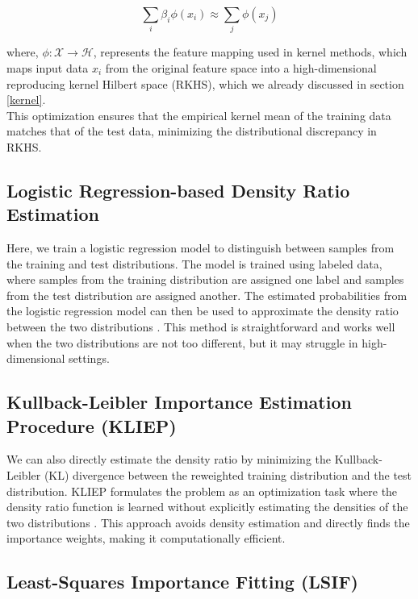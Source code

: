 \begin{equation}
    \sum_i \beta_i \phi(x_i) \approx \sum_j \phi(x_j)
    \label{eqn:3.17}
\end{equation}

where, $\phi: \mathcal{X} \to \mathcal{H}$, represents the feature mapping used in kernel methods, which maps input data $x_i$ from the original feature space into a high-dimensional reproducing kernel Hilbert space (RKHS), which we already discussed in section \ref{kernel}.\\

This optimization ensures that the empirical kernel mean of the training data matches that of the test data, minimizing the distributional discrepancy in RKHS.

\subsection{Logistic Regression-based Density Ratio Estimation}

Here, we train a logistic regression model to distinguish between samples from the training and test distributions. The model is trained using labeled data, where samples from the training distribution are assigned one label and samples from the test distribution are assigned another. The estimated probabilities from the logistic regression model can then be used to approximate the density ratio between the two distributions \citep{qin1994empirical}. This method is straightforward and works well when the two distributions are not too different, but it may struggle in high-dimensional settings.

\subsection{Kullback-Leibler Importance Estimation Procedure (KLIEP)}

We can also directly estimate the density ratio by minimizing the Kullback-Leibler (KL) divergence between the reweighted training distribution and the test distribution. KLIEP formulates the problem as an optimization task where the density ratio function is learned without explicitly estimating the densities of the two distributions \citep{sugiyama2008kliep}. This approach avoids density estimation and directly finds the importance weights, making it computationally efficient.

\subsection{Least-Squares Importance Fitting (LSIF)}

